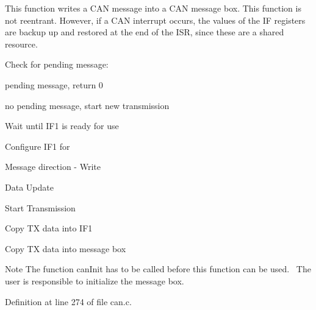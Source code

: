 This function writes a C\+AN message into a C\+AN message box. This function is not reentrant. However, if a C\+AN interrupt occurs, the values of the IF registers are backup up and restored at the end of the I\+SR, since these are a shared resource. 
\begin{DoxyItemize}
\item Check for pending message\+:
\begin{DoxyItemize}
\item pending message, return 0
\item no pending message, start new transmission
\end{DoxyItemize}
\item Wait until I\+F1 is ready for use ~\newline
~\newline
~\newline
~\newline

\item Configure I\+F1 for
\begin{DoxyItemize}
\item Message direction -\/ Write
\item Data Update
\item Start Transmission
\end{DoxyItemize}
\item Copy TX data into I\+F1 ~\newline
~\newline

\item Copy TX data into message box ~\newline
 \begin{DoxyNote}{Note}
The function can\+Init has to be called before this function can be used.~\newline
 The user is responsible to initialize the message box.
\end{DoxyNote}

\end{DoxyItemize}

Definition at line 274 of file can.\+c.


